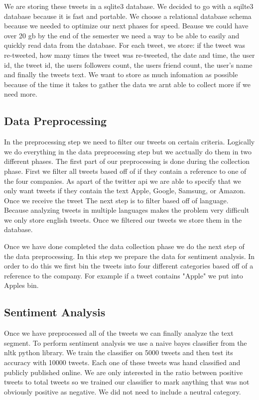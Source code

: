 \documentclass{acm_proc_article-sp}
\begin{document}
We are storing these tweets in a sqlite3 database. We decided to go with a
sqilte3 database because it is fast and portable. We choose a relational
database schema because we needed to optimize our next phases for speed. Beause
we could have over 20 gb by the end of the semester we need a way to be able to
easily and quickly read data from the database. For each tweet, we store:  if
the tweet was re-tweeted, how many times the tweet was re-tweeted, the date and
time, the user id, the tweet id, the users followers count, the users friend
count, the user's name and finally the tweets text. We want to store as much
infomation as possible because of the time it takes to gather the data we arnt
able to collect more if we need more. 

\subsection{Data Preprocessing}

In the preprocessing step we need to filter our tweets on certain criteria.
Logically we do everything in the data preprocessing step but we acctually do
them in two different phases. The first part of our preprocessing is done
during the collection phase. First we filter all tweets based off of if they
contain a reference to one of the four companies. As apart of the twitter api
we are able to specify that we only want tweets if they contain the text Apple,
Google, Samsung, or Amazon. Once we receive the tweet The next step is to
filter based off of language. Because analyzing tweets in multiple languages
makes the problem very difficult we only store english tweets. Once we filtered
our tweets we store them in the database.

Once we have done completed the data collection phase we do the next step of
the data preprocessing. In this step we prepare the data for sentiment
analysis. In order to do this we first bin the tweets into four different
categories based off of a reference to the company. For example if a tweet
contains "Apple" we put into Apples bin.  

\subsection{Sentiment Analysis}

Once we have preprocessed all of the tweets we can finally analyze the text
segment. To perform sentiment analysis we use a naive bayes classifier from the
nltk python library. We train the classifier on 5000 tweets and then test its
accuracy with 10000 tweets. Each one of these tweets was hand classified and
publicly published online. We are only interested in the ratio between positive
tweets to total tweets so we trained our classifier to mark anything that was
not obviously positive as negative. We did not need to include a neutral
category.
\end{document}
